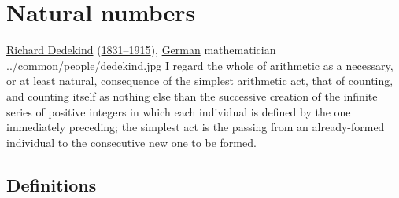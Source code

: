 \section{Natural numbers}
\qboxnpq
  {\href{http://www-history.mcs.st-andrews.ac.uk/Mathematicians/Dedekind.html}{Richard Dedekind}
   (\href{http://www-history.mcs.st-andrews.ac.uk/Timelines/TimelineF.html}{1831--1915}),
   \href{http://www-history.mcs.st-andrews.ac.uk/BirthplaceMaps/Places/Germany.html}{German} mathematician
   \footnotemark
  }
  {../common/people/dedekind.jpg}
  {I regard the whole of arithmetic as a necessary, or at least natural,
   consequence of the simplest arithmetic act, that of counting,
   and counting itself as nothing else than the successive creation
   of the infinite series of positive integers in which each individual
   is defined by the one immediately preceding;
   the simplest act is the passing from an already-formed individual to the consecutive
   new one to be formed.}

\subsection{Definitions}


